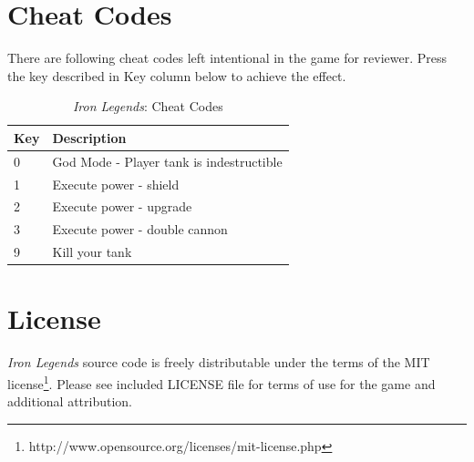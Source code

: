 \documentclass[letterpaper,11pt,twoside]{article}
\begin{document}
\section{Cheat Codes}

There are following cheat codes left intentional in the game for reviewer.
Press the key described in Key column below to achieve the effect.

\begin{table}[htb]
	\centering
		\begin{tabular}{l|l}
		  \toprule
			Key & Description \\
			\midrule
            0 & God Mode - Player tank is indestructible \\
            1 & Execute power - shield \\
            2 & Execute power - upgrade \\
            3 & Execute power - double cannon \\
            9 & Kill your tank \\
			\bottomrule
		\end{tabular}
	\caption{\emph{Iron Legends}: Cheat Codes}
\end{table}


\section{License}
\emph{Iron Legends} source code is freely distributable under the terms of the MIT license\footnote{http://www.opensource.org/licenses/mit-license.php}.
Please see included LICENSE file for terms of use for the game and additional attribution.
\end{document}
